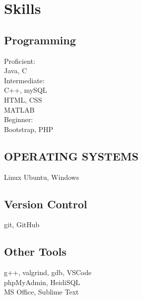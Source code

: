 \documentclass[]{deedy-resume-openfont}
\begin{document}
\begin{minipage}[t]{0.33\textwidth} 

\large{
\section{\huge {\bf Skills}}
\subsection{Programming}
\hspace{5mm}Proficient: \\
\hspace*{15mm}Java, \hspace{1mm}C\\
\hspace*{5mm}Intermediate: \\
\hspace*{15mm}C++, \hspace{1mm}mySQL\\
\hspace*{15mm}HTML, \hspace{1mm}CSS\\
\hspace*{15mm}MATLAB\\
\hspace*{5mm}Beginner: \\
\hspace*{15mm}Bootstrap, \hspace{1mm}PHP
\sectionsep


\subsection{OPERATING SYSTEMS} \hspace{5mm}Linux Ubuntu, \hspace{1mm}Windows 
\sectionsep

\subsection{Version Control}
\hspace{5mm}git, \hspace{1mm} GitHub
\sectionsep

\subsection{Other Tools}
\hspace*{5mm}g++,\hspace{1mm} valgrind,
\hspace{1mm}gdb,\hspace{1mm} VSCode\\
\hspace*{5mm}phpMyAdmin,\hspace{1mm} HeidiSQL\\
\hspace*{5mm}MS Office,\hspace{1mm} Sublime Text
\sectionsep

}
\end{minipage}
\end{document}
